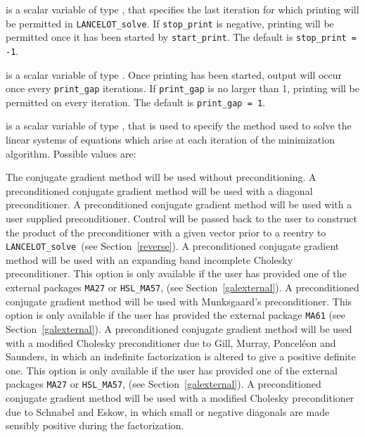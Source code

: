 \documentclass{galahad}
\newcommand{\fullpackagename}{LANC\-E\-LOT}
\newcommand{\solver}{{\tt \fullpackagename\_solve}}
\begin{document}
\begin{description}
 is a scalar variable of type \integer, that specifies
the last iteration for which printing will be permitted in  \solver.
If {\tt stop\_print} is negative, printing will be permitted once it has been
started by {\tt start\_print}.
The default is {\tt stop\_print = -1}.

 is a scalar variable of type \integer.
Once printing has been started, output will occur once every
{\tt print\_gap} iterations. If {\tt print\_gap} is no larger than 1,
printing will be permitted on every iteration.
The default is {\tt print\_gap = 1}.

 is a scalar variable of type \integer, that
is used to specify the method used to solve the linear systems of equations
which arise at each iteration of the minimization algorithm.
 Possible values are:
\begin{description}
    The conjugate gradient method will be used without preconditioning.
    A preconditioned conjugate gradient
    method will be used with a diagonal
    preconditioner.
    A preconditioned conjugate gradient
    method will be used with a user supplied
    preconditioner. Control will be passed back to the user to
    construct the product of the preconditioner with a given
    vector prior to a reentry to \solver\
    (see Section~\ref{reverse}).
    A preconditioned conjugate gradient
    method will be used with an expanding band
    incomplete Cholesky preconditioner.
    This option is only available if the user has provided one of the
    external packages {\tt MA27} or {\tt HSL\_MA57},
    (see Section~\ref{galexternal}).
    A preconditioned conjugate gradient
    method will be used with Munksgaard's
    preconditioner.
    This option is only available if the user has provided the
    external package {\tt MA61}
    (see Section~\ref{galexternal}).
    A preconditioned conjugate gradient
    method will be used with a modified Cholesky
    preconditioner due to Gill, Murray, Poncel\'{e}on and Saunders,
    in which an indefinite factorization is altered to give a positive 
    definite one.
    This option is only available if the user has provided one of the
    external packages {\tt MA27} or {\tt HSL\_MA57},
    (see Section~\ref{galexternal}).
    A preconditioned conjugate gradient
    method will be used with a modified Cholesky
    preconditioner due to Schnabel and Eskow, 
    in which small or negative diagonals are
    made sensibly positive during the factorization. 

\end{description}
\end{description}
\end{document}
